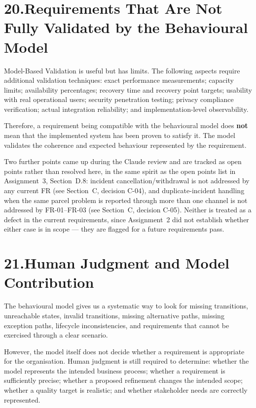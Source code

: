 \documentclass[11pt,a4paper]{article}
\begin{document}
\section*{20.\enspace Requirements That Are Not Fully Validated by the Behavioural Model}

Model-Based Validation is useful but has limits. The following aspects require additional validation techniques: exact performance measurements; capacity limits; availability percentages; recovery time and recovery point targets; usability with real operational users; security penetration testing; privacy compliance verification; actual integration reliability; and implementation-level observability.

Therefore, a requirement being compatible with the behavioural model does \textbf{not} mean that the implemented system has been proven to satisfy it. The model validates the coherence and expected behaviour represented by the requirement.

Two further points came up during the Claude review and are tracked as open points rather than resolved here, in the same spirit as the open points list in Assignment~3, Section~D.8: incident cancellation/withdrawal is not addressed by any current FR (see Section~C, decision C-04), and duplicate-incident handling when the same parcel problem is reported through more than one channel is not addressed by FR-01–FR-03 (see Section~C, decision C-05). Neither is treated as a defect in the current requirements, since Assignment~2 did not establish whether either case is in scope — they are flagged for a future requirements pass.

\section*{21.\enspace Human Judgment and Model Contribution}

The behavioural model gives us a systematic way to look for missing transitions, unreachable states, invalid transitions, missing alternative paths, missing exception paths, lifecycle inconsistencies, and requirements that cannot be exercised through a clear scenario.

However, the model itself does not decide whether a requirement is appropriate for the organisation. Human judgment is still required to determine: whether the model represents the intended business process; whether a requirement is sufficiently precise; whether a proposed refinement changes the intended scope; whether a quality target is realistic; and whether stakeholder needs are correctly represented.
\end{document}
